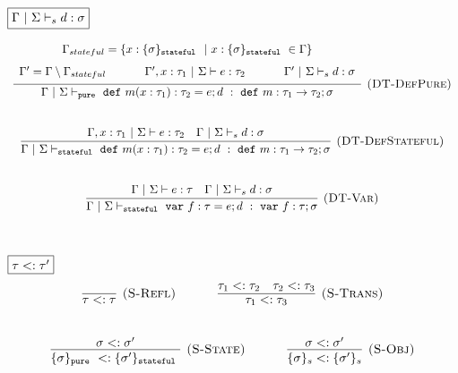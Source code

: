 \documentclass{llncs}
\newcommand{\keywadj}[1]{\mathtt{#1}}
\newcommand{\keyw}[1]{\keywadj{#1}~}
\begin{document}
$\fbox{$\Gamma~|~\Sigma \vdash_s d : \sigma$}$
\[
\begin{array}{c}

\infer[\textsc{(DT-DefPure)}]
  {\Gamma~|~\Sigma \vdash_{\keyw{pure}} \keyw{def} m(x : \tau_1) : \tau_2 = e; d~:~\keyw{def} m : \tau_1 \rightarrow \tau_2; \sigma}
  {\def\arraystretch{1.6}
  \begin{array}{c}
\Gamma_{stateful} = \{x : \{ \sigma \}_{\keyw{stateful}} ~|~ x : \{ \sigma \}_{\keyw{stateful}} \in \Gamma\} \\
\Gamma' = \Gamma \setminus \Gamma_{stateful}~~~~~~~~~~\Gamma', x : \tau_1~|~\Sigma \vdash e : \tau_2~~~~~~~~~~\Gamma'~|~\Sigma \vdash_s d : \sigma
  \end{array}}\\[5ex]

\infer[\textsc{(DT-DefStateful)}]
  {\Gamma~|~\Sigma \vdash_{\keyw{stateful}} \keyw{def} m(x : \tau_1) : \tau_2 = e; d~:~\keyw{def} m : \tau_1 \rightarrow \tau_2; \sigma}
  {\Gamma, x : \tau_1~|~\Sigma \vdash e : \tau_2 & \Gamma~|~\Sigma \vdash_s d : \sigma}\\[5ex]

\infer[\textsc{(DT-Var)}]
  {\Gamma~|~\Sigma \vdash_{\keyw{stateful}} \keyw{var} f : \tau = e; d~:~\keyw{var} f : \tau; \sigma}
  {\Gamma~|~\Sigma \vdash e : \tau & \Gamma~|~\Sigma \vdash_s d : \sigma}\\[5ex]

\end{array}
\]

$\fbox{$\tau <: \tau'$}$
\[
\begin{array}{c}
\infer[\textsc{(S-Refl)}]
  {\tau <: \tau}
  {}%
~~~~~~~~~~
\infer[\textsc{(S-Trans)}]
  {\tau_1 <: \tau_3}
  {\tau_1 <: \tau_2 & \tau_2 <: \tau_3}\\[5ex]

\infer[\textsc{(S-State)}]
  {\{ \sigma \}_{\keyw{pure}} <: \{ \sigma' \}_{\keyw{stateful}}}
  {\sigma <: \sigma'}%
~~~~~~~~~~
\infer[\textsc{(S-Obj)}]
  {\{ \sigma \}_{s} <: \{ \sigma' \}_{s}}
  {\sigma <: \sigma'}\\[5ex]  

\end{array}
\]
\end{document}
